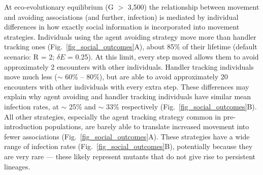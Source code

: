 At eco-evolutionary equilibrium (G $>$ 3,500) the relationship between movement and avoiding associations (and further, infection) is mediated by individual differences in how exactly social information is incorporated into movement strategies.
Individuals using the agent avoiding strategy move more than handler tracking ones (Fig.~\ref{fig_social_outcomes}A), about 85\% of their lifetime (default scenario: R = 2; $\delta E$ = 0.25).
At this limit, every step moved allows them to avoid approximately 2 encounters with other individuals.
Handler tracking individuals move much less ($\sim$ 60\% -- 80\%), but are able to avoid approximately 20 encounters with other individuals with every extra step.
These differences may explain why agent avoiding and handler tracking individuals have similar mean infection rates, at $\sim$ 25\% and $\sim$ 33\% respectively (Fig.~\ref{fig_social_outcomes}B).
All other strategies, especially the agent tracking strategy common in pre-introduction populations, are barely able to translate increased movement into fewer associations (Fig.~\ref{fig_social_outcomes}A).
These strategies have a wide range of infection rates (Fig.~\ref{fig_social_outcomes}B), potentially because they are very rare --- these likely represent mutants that do not give rise to persistent lineages.

